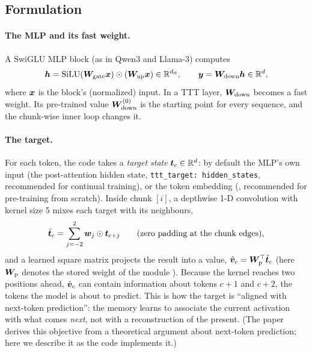 \subsection{Formulation}

\paragraph{The MLP and its fast weight.} A SwiGLU MLP block (as in Qwen3 and Llama-3) computes
\begin{equation}
  \bm{h} = \operatorname{SiLU}(\bm{W}_{\text{gate}}\bm{x}) \odot (\bm{W}_{\text{up}}\bm{x}) \in \mathbb{R}^{d_{\text{ff}}}, \qquad
  \bm{y} = \bm{W}_{\text{down}}\bm{h} \in \mathbb{R}^{d},
\end{equation}
where $\bm{x}$ is the block's (normalized) input. In a TTT layer, $\bm{W}_{\text{down}}$ becomes a
fast weight. Its pre-trained value $\bm{W}_{\text{down}}^{(0)}$ is the starting point for every
sequence, and the chunk-wise inner loop changes it.

\paragraph{The target.} For each token, the code takes a \emph{target state} $\bm{t}_c \in \mathbb{R}^d$:
by default the MLP's own input (the post-attention hidden state, \texttt{ttt\_target: hidden\_states},
recommended for continual training), or the token embedding (, recommended for
pre-training from scratch). Inside chunk $[i]$, a depthwise 1-D convolution with kernel size 5
mixes each target with its neighbours,
\begin{equation}
  \tilde{\bm{t}}_c = \sum_{j=-2}^{2} \bm{w}_j \odot \bm{t}_{c+j} \qquad (\text{zero padding at the chunk edges}),
\end{equation}
and a learned square matrix projects the result into a value,
$\hat{\bm{v}}_c = \bm{W}_{\mathrm{p}}^{\top}\tilde{\bm{t}}_c$ (here $\bm{W}_{\mathrm{p}}$ denotes the stored weight
of the module ). Because the kernel reaches two positions ahead, $\hat{\bm{v}}_c$ can
contain information about tokens $c+1$ and $c+2$, the tokens the model is about to predict.
This is how the target is ``aligned with next-token prediction'': the memory learns to associate
the current activation with what comes \emph{next}, not with a reconstruction of the present.
(The paper derives this objective from a theoretical argument about next-token prediction;
here we describe it as the code implements it.)

